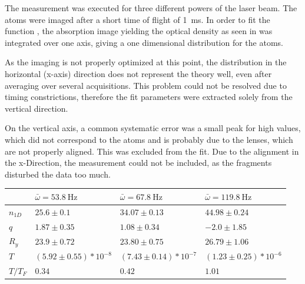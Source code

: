 The measurement was executed for three different powers of the laser beam. The atoms were imaged after a short time of flight of \SI{1}{\milli\second}. In order to fit the function , the absorption image yielding the optical density as seen in  was integrated over one axis, giving a one dimensional distribution for the atoms.

As the imaging is not properly optimized at this point, the distribution in the horizontal (x-axis) direction does not represent the theory well, even after averaging over several acquisitions. This problem could not be resolved due to timing constrictions, therefore the fit parameters were extracted solely from the vertical direction.

On the vertical axis, a common systematic error was a small peak for high values, which did not correspond to the atoms and is probably due to the lenses, which are not properly aligned. This was excluded from the fit. Due to the alignment in the x-Direction, the measurement could not be included, as the fragments disturbed the data too much.
\begin{table}
	\begin{center}
		\begin{tabular}{|l||l|l|l|}
			\hline
			& $\bar{\omega}=\SI{53.8}{\hertz}$ & $\bar{\omega}=\SI{67.8}{\hertz}$ & $\bar{\omega}=\SI{119.8}{\hertz}$ \\ 
			\hline
			\hline
			$n_{1D}$ & $25.6\pm0.1$ & $34.07\pm0.13$ & $44.98\pm0.24$ \\ 
			\hline
			$q$ & $1.87\pm0.35$ & $1.08\pm0.34$ & $-2.0\pm1.85$ \\
			\hline
			$R_y$ & $23.9\pm0.72$ & $23.80\pm0.75$ & $26.79\pm1.06$ \\
			\hline
			\hline
			$T$ & $(5.92\pm0.55)*10^{-8}$ & $(7.43\pm0.14)*10^{-7}$ & $(1.23\pm0.25)*10^{-6}$ \\
			\hline
			$T/T_F$ & $0.34$ & $0.42$ & $1.01$ \\
			\hline
		\end{tabular}
	\end{center}
	\label{tab:fermi_fit}
\end{table}

